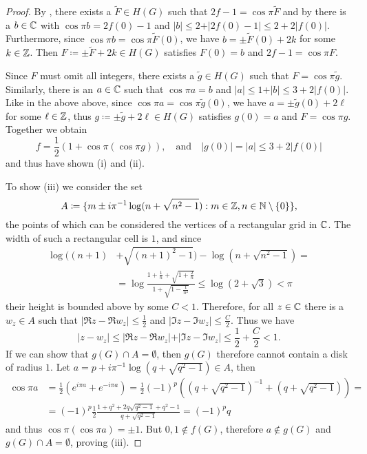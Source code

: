 \begin{proof}
    By , there exists a $\widetilde{F} \in H(G)$ such that $2f - 1 = \cos \pi \widetilde{F}$ and by  there is a $b \in \mathbb{C}$ with $\cos \pi b = 2f(0) - 1$ and $\vert b \vert \leq 2 + \vert 2 f(0) - 1 \vert \leq 2 + 2 \vert f(0) \vert$. Furthermore, since $\cos \pi b = \cos \pi \widetilde{F}(0)$, we have $b = \pm \widetilde{F}(0) + 2k$ for some $k \in \mathbb{Z}$. Then $F \coloneqq \pm \widetilde{F} + 2k \in H(G)$ satisfies $F(0) = b$ and $2f - 1 = \cos \pi F$.
    
    Since $F$ must omit all integers, there exists a $\widetilde{g} \in H(G)$ such that $F = \cos \pi \widetilde{g}$. Similarly, there is an $a \in \mathbb{C}$ such that $\cos \pi a = b$ and $\vert a \vert \leq 1 + \vert b \vert \leq 3 + 2 \vert f(0) \vert$. Like in the above above, since $\cos \pi a = \cos \pi \widetilde{g}(0)$, we have $a = \pm \widetilde{g}(0) + 2\ell$ for some $\ell \in \mathbb{Z}$, thus $g \coloneqq \pm \widetilde{g} + 2\ell \in H(G)$ satisfies $g(0) = a$ and $F = \cos \pi g$. Together we obtain
    $$ \textstyle f = \frac{1}{2} (1 + \cos \pi (\cos \pi g)), \quad \textrm{and} \quad \vert g(0) \vert = \vert a \vert \leq 3 + 2 \vert f(0) \vert $$
    and thus have shown (i) and (ii).

    To show (iii) we consider the set
    $$ A \coloneqq \{ m \pm i \pi^{-1} \log (n + \sqrt{n^2 - 1}) : m \in \mathbb{Z}, n \in \mathbb{N} \setminus \{ 0 \} \}, $$
    the points of which can be considered the vertices of a rectangular grid in $\mathbb{C}$. The width of such a rectangular cell is $1$, and since
    \begin{align*}
        \log ((n+1) &+ \sqrt{(n+1)^2 - 1}) - \log (n + \sqrt{n^2 - 1}) = \\
        &= \log \frac{1 + \frac{1}{n} + \sqrt{1 + \frac{2}{n}}}{1 + \sqrt{1 - \frac{1}{n^2}}} \leq \log (2 + \sqrt{3}) < \pi
    \end{align*}
    their height is bounded above by some $C < 1$. Therefore, for all $z \in \mathbb{C}$ there is a $w_z \in A$ such that $\vert \Re z - \Re w_z \vert \leq \frac{1}{2}$ and $\vert \Im z - \Im w_z \vert \leq \frac{C}{2}$. Thus we have
    $$ \vert z - w_z \vert \leq \vert \Re z - \Re w_z \vert + \vert \Im z - \Im w_z \vert \leq \frac{1}{2} + \frac{C}{2} < 1. $$
    If we can show that $g(G) \cap A = \emptyset$, then $g(G)$ therefore cannot contain a disk of radius $1$. Let $a = p + i \pi^{-1} \log(q + \sqrt{q^2 - 1}) \in A$, then
    \begin{align*}
        \cos \pi a &= {\textstyle\frac{1}{2}}( e^{i \pi a} + e^{-i \pi a}) = {\textstyle\frac{1}{2}} (-1)^p ((q + \sqrt{q^2 - 1})^{-1} + (q + \sqrt{q^2 - 1})) = \\
        &= (-1)^p \frac{1}{2} \frac{1 + q^2 + 2q \sqrt{q^2 - 1} + q^2 - 1}{q + \sqrt{q^2 - 1}} = (-1)^p q
    \end{align*}
    and thus $\cos \pi (\cos \pi a) = \pm 1$. But $0, 1 \notin f(G)$, therefore $a \notin g(G)$ and $g(G) \cap A = \emptyset$, proving (iii).


\end{proof}
